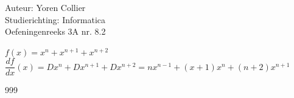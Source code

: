 \documentclass[a4paper]{article}
\newcommand{\Lh}{\left(} %
\newcommand{\Rh}{\right)}
\begin{document}
\noindent \large Auteur: Yoren Collier \\
\noindent \large Studierichting: Informatica\\
\noindent \large Oefeningenreeks 3A nr. 8.2\\

\medskip

\normalsize

$f(x) = x^n + x^{n+1} + x^{n+2}$\\

$\dfrac{df}{dx}(x) = Dx^n + Dx^{n+1} + Dx^{n+2} = nx^{n-1} + \Lh x+1 \Rh x^n + \Lh n+2 \Rh x^{n+1}$\\

\begin{thebibliography}{999}
\end{thebibliography}
\end{document}
